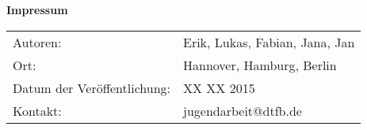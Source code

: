\thispagestyle{empty}



\null
\vfill
\vfill
{\raggedright \normalfont \bfseries Impressum}
\vspace{0.5cm}

{
  \raggedright

\begin{tabular}{ll}
  Autoren: & Erik, Lukas, Fabian, Jana, Jan 
    \\%
  Ort: &  Hannover, Hamburg, Berlin
    \\%
  Datum der Veröffentlichung: & XX XX 2015
    \\%
  Kontakt: & jugendarbeit@dtfb.de
    \\%
\end{tabular}
}
\vfill

